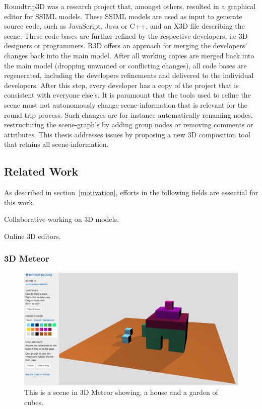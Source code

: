 Roundtrip3D was a research project that, amongst others, resulted in a
graphical editor for \gls{SSIML} models.
These SSIML models are used as input to generate source code, such as JavaScript, Java or C++, and an \gls{X3D} file describing the scene.
These code bases are further refined by the respective developers, i.e 3D designers or programmers.
R3D offers an approach for merging the developers' changes back into the main model.
After all working copies are merged back into the main model (dropping
unwanted or conflicting changes), all code bases are regenerated, including the developers refinements and
delivered to the individual developers.
After this step, every
developer has a copy of the project that is consistent with everyone
else's. \cite{Jung:2015:SDA:2802768.2802837}
It is paramount that the tools used to refine the scene must not autonomously change scene-information that is relevant for the round trip process.
Such changes are for instance automatically renaming nodes, restructuring the scene-graph's by adding group nodes or removing comments or attributes.
This thesis addresses issues by proposing a new 3D composition tool that retains all scene-information.

\subsection{Related Work}
\label{related-work}

As described in section~\ref{motivation}, efforts in the following fields are essential for this work.

\begin{itemize*}
  \item Collaborative working on \gls{3D} models.
  \item Online \gls{3D} editors.
\end{itemize*}

\subsubsection{3D Meteor}
\label{d-meteor0}

\begin{figure}[htbp]
  \centering
  \includegraphics[width=12cm]{../assets/3dmeteor.png}
  \caption{This is a scene in 3D Meteor showing, a house and a garden of cubes.}
	\label{fig:3dmeteor}
\end{figure}

